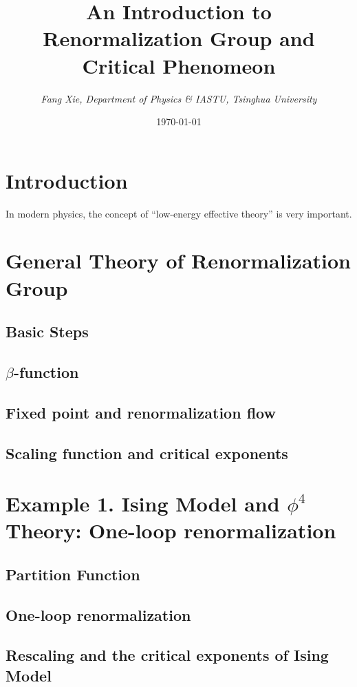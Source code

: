 \documentclass{article}
\author{\emph{Fang Xie, Department of Physics \& IASTU, Tsinghua University}}
\title{{\bf{An Introduction to Renormalization Group and Critical Phenomeon}}}
\date{\today}
\begin{document}
\maketitle
\section{Introduction}
In modern physics, the concept of ``low-energy effective theory'' is very important.

\section{General Theory of Renormalization Group}
\subsection{Basic Steps}

\subsection{$\beta$-function}

\subsection{Fixed point and renormalization flow}

\subsection{Scaling function and critical exponents}

\section{Example 1. Ising Model and $\phi^4$ Theory: One-loop renormalization}
\subsection{Partition Function}

\subsection{One-loop renormalization}

\subsection{Rescaling and the critical exponents of Ising Model}
\end{document}
